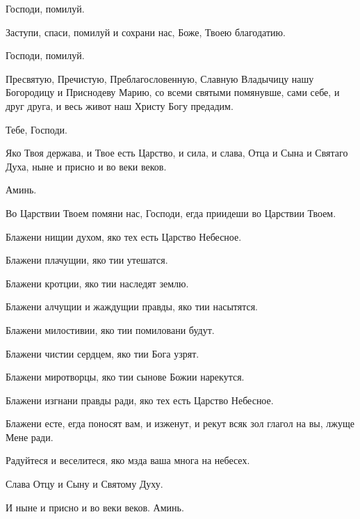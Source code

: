 \begin{mymulticols}
 Господи, помилуй. 

 Заступи, спаси, помилуй и сохрани нас, Боже, Твоею благодатию. 

 Господи, помилуй. 

 Пресвятую, Пречистую, Преблагословенную, Славную Владычицу нашу Богородицу и Приснодеву Марию, со всеми святыми помянувше, сами себе, и друг друга, и весь живот наш Христу Богу предадим.

 Тебе, Господи. 

 Яко Твоя держава, и Твое есть Царство, и сила, и слава, Отца и Сына и Святаго Духа, ныне и присно и во веки веков. 

 Аминь.



 Во Царствии Твоем помяни нас, Господи, егда приидеши во Царствии Твоем. 

 Блажени нищии духом, яко тех есть Царство Небесное. 

 Блажени плачущии, яко тии утешатся.

 Блажени кротции, яко тии наследят землю. 

 Блажени алчущии и жаждущии правды, яко тии насытятся.

 Блажени милостивии, яко тии помиловани будут. 

 Блажени чистии сердцем, яко тии Бога узрят.

 Блажени миротворцы, яко тии сынове Божии нарекутся. 

 Блажени изгнани правды ради, яко тех есть Царство Небесное.

 Блажени есте, егда поносят вам, и изженут, и рекут всяк зол глагол на вы, лжуще Мене ради. 

 Радуйтеся и веселитеся, яко мзда ваша многа на небесех. 

 Слава Отцу и Сыну и Святому Духу. 

 И ныне и присно и во веки веков. Аминь. 


\end{mymulticols}
